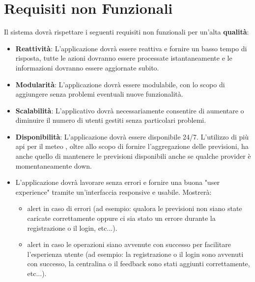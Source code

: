 	\section{Requisiti non Funzionali}	
    Il sistema dovrà rispettare i seguenti requisiti non funzionali per un'alta \textbf{qualità}:
 
            \begin{itemize}
                \item \textbf{Reattività}: L'applicazione dovrà essere reattiva e fornire un basso tempo di risposta, tutte le azioni dovranno essere processate istantaneamente e le informazioni dovranno essere aggiornate subito.
                
                \item \textbf{Modularità}: L'applicazione dovrà essere modulabile, con lo scopo di aggiungere senza problemi eventuali nuove funzionalità.
                
                \item \textbf{Scalabilità}: L'applicativo dovrà necessariamente consentire di aumentare o diminuire il numero di utenti gestiti senza particolari problemi. 
                
                \item \textbf{Disponibilità}: L'applicazione dovrà essere disponibile 24/7. L'utilizzo di più api per il meteo , oltre allo scopo di fornire l'aggregazione delle previsioni, ha anche quello di mantenere le previsioni disponibili anche se qualche provider è momentaneamente down.
                
                \item L'applicazione dovrà lavorare senza errori e fornire una buona "user experience" tramite un'interfaccia responsive e usabile. Mostrerà:
                \begin{itemize}
                     \item alert in caso di errori (ad esempio: qualora le previsioni non siano state caricate correttamente oppure ci sia stato un errore durante la registrazione o il login, etc...).
	\item alert in caso le operazioni siano avvenute con successo per facilitare l'esperienza utente (ad esempio: la registrazione o il login sono avvenuti con successo, la centralina o il feedback sono stati aggiunti correttamente, etc...).
                \end{itemize}
                
               
            \end{itemize}
        

